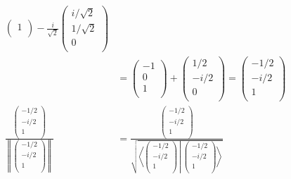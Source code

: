 \documentclass[dvipdfmx]{jsarticle}
\begin{document}
\begin{align*}
\begin{pmatrix}
1 \\
\end{pmatrix} - \frac{i}{\sqrt{2}}\begin{pmatrix}
{i}/{\sqrt{2}} \\
{1}/{\sqrt{2}} \\
0 \\
\end{pmatrix}\\
&= \begin{pmatrix}
 - 1 \\
0 \\
1 \\
\end{pmatrix} + \begin{pmatrix}
{1}/{2} \\
 - {i}/{2} \\
0 \\
\end{pmatrix} = \begin{pmatrix}
 - {1}/{2} \\
 - {i}/{2} \\
1 \\
\end{pmatrix}\\
\frac{\begin{pmatrix}
 - {1}/{2} \\
 - {i}/{2} \\
1 \\
\end{pmatrix}}{\left\| \begin{pmatrix}
 - {1}/{2} \\
 - {i}/{2} \\
1 \\
\end{pmatrix} \right\|} &= \frac{\begin{pmatrix}
 - {1}/{2} \\
 - {i}/{2} \\
1 \\
\end{pmatrix}}{\sqrt{\left\langle \begin{pmatrix}
 - {1}/{2} \\
 - {i}/{2} \\
1 \\
\end{pmatrix} \middle| \begin{pmatrix}
 - {1}/{2} \\
 - {i}/{2} \\
1 \\
\end{pmatrix} \right\rangle}}\\

\end{align*}
\end{document}
